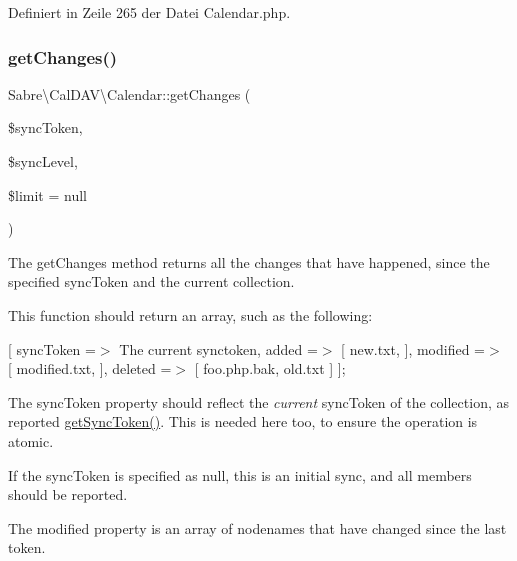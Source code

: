 Definiert in Zeile 265 der Datei Calendar.\+php.

\mbox{\label{class_sabre_1_1_cal_d_a_v_1_1_calendar_a3df48ca7fbf0f4bed2cdaa3e9d3f651e}} 
\subsubsection{\texorpdfstring{get\+Changes()}{getChanges()}}
{\footnotesize\ttfamily Sabre\textbackslash{}\+Cal\+D\+A\+V\textbackslash{}\+Calendar\+::get\+Changes (\begin{DoxyParamCaption}\item[{}]{\$sync\+Token,  }\item[{}]{\$sync\+Level,  }\item[{}]{\$limit = {\ttfamily null} }\end{DoxyParamCaption})}

The get\+Changes method returns all the changes that have happened, since the specified sync\+Token and the current collection.

This function should return an array, such as the following\+:

\mbox{[} \textquotesingle{}sync\+Token\textquotesingle{} =$>$ \textquotesingle{}The current synctoken\textquotesingle{}, \textquotesingle{}added\textquotesingle{} =$>$ \mbox{[} \textquotesingle{}new.\+txt\textquotesingle{}, \mbox{]}, \textquotesingle{}modified\textquotesingle{} =$>$ \mbox{[} \textquotesingle{}modified.\+txt\textquotesingle{}, \mbox{]}, \textquotesingle{}deleted\textquotesingle{} =$>$ \mbox{[} \textquotesingle{}foo.\+php.\+bak\textquotesingle{}, \textquotesingle{}old.\+txt\textquotesingle{} \mbox{]} \mbox{]};

The sync\+Token property should reflect the {\itshape current} sync\+Token of the collection, as reported \mbox{\hyperlink{class_sabre_1_1_cal_d_a_v_1_1_calendar_a74fa64b6484a0cd7f3300d89a96d74d9}{get\+Sync\+Token()}}. This is needed here too, to ensure the operation is atomic.

If the sync\+Token is specified as null, this is an initial sync, and all members should be reported.

The modified property is an array of nodenames that have changed since the last token.

